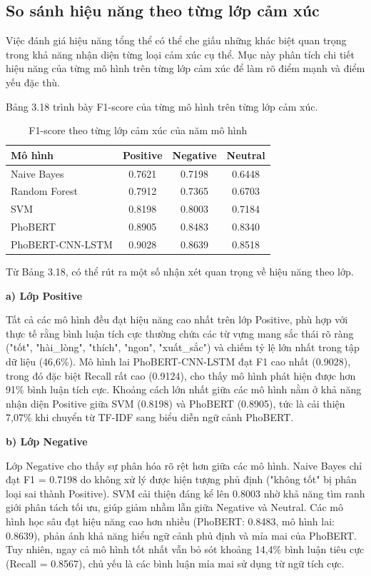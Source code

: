 \documentclass[14pt, a4paper]{report}
\begin{document}
\subsection{So sánh hiệu năng theo từng lớp cảm xúc}


Việc đánh giá hiệu năng tổng thể có thể che giấu những khác biệt quan trọng trong khả năng nhận diện từng loại cảm xúc cụ thể. Mục này phân tích chi tiết hiệu năng của từng mô hình trên từng lớp cảm xúc để làm rõ điểm mạnh và điểm yếu đặc thù.


Bảng 3.18 trình bày F1-score của từng mô hình trên từng lớp cảm xúc.


\begin{table}[h]
\centering
\caption{F1-score theo từng lớp cảm xúc của năm mô hình}
\begin{tabular}{|l|c|c|c|}
\hline
\textbf{Mô hình} & \textbf{Positive} & \textbf{Negative} & \textbf{Neutral} \\
\hline
Naive Bayes & 0.7621 & 0.7198 & 0.6448 \\
\hline
Random Forest & 0.7912 & 0.7365 & 0.6703 \\
\hline
SVM & 0.8198 & 0.8003 & 0.7184 \\
\hline
PhoBERT & 0.8905 & 0.8483 & 0.8340 \\
\hline
PhoBERT-CNN-LSTM & 0.9028 & 0.8639 & 0.8518 \\
\hline
\end{tabular}
\end{table}




Từ Bảng 3.18, có thể rút ra một số nhận xét quan trọng về hiệu năng theo lớp.


\textbf{a) Lớp Positive}


Tất cả các mô hình đều đạt hiệu năng cao nhất trên lớp Positive, phù hợp với thực tế rằng bình luận tích cực thường chứa các từ vựng mang sắc thái rõ ràng ("tốt", "hài\_lòng", "thích", "ngon", "xuất\_sắc") và chiếm tỷ lệ lớn nhất trong tập dữ liệu (46,6\%). Mô hình lai PhoBERT-CNN-LSTM đạt F1 cao nhất (0.9028), trong đó đặc biệt Recall rất cao (0.9124), cho thấy mô hình phát hiện được hơn 91\% bình luận tích cực. Khoảng cách lớn nhất giữa các mô hình nằm ở khả năng nhận diện Positive giữa SVM (0.8198) và PhoBERT (0.8905), tức là cải thiện 7,07\% khi chuyển từ TF-IDF sang biểu diễn ngữ cảnh PhoBERT.


\textbf{b) Lớp Negative}


Lớp Negative cho thấy sự phân hóa rõ rệt hơn giữa các mô hình. Naive Bayes chỉ đạt F1 = 0.7198 do không xử lý được hiện tượng phủ định ("không tốt" bị phân loại sai thành Positive). SVM cải thiện đáng kể lên 0.8003 nhờ khả năng tìm ranh giới phân tách tối ưu, giúp giảm nhầm lẫn giữa Negative và Neutral. Các mô hình học sâu đạt hiệu năng cao hơn nhiều (PhoBERT: 0.8483, mô hình lai: 0.8639), phản ánh khả năng hiểu ngữ cảnh phủ định và mỉa mai của PhoBERT. Tuy nhiên, ngay cả mô hình tốt nhất vẫn bỏ sót khoảng 14,4\% bình luận tiêu cực (Recall = 0.8567), chủ yếu là các bình luận mỉa mai sử dụng từ ngữ tích cực.
\end{document}
